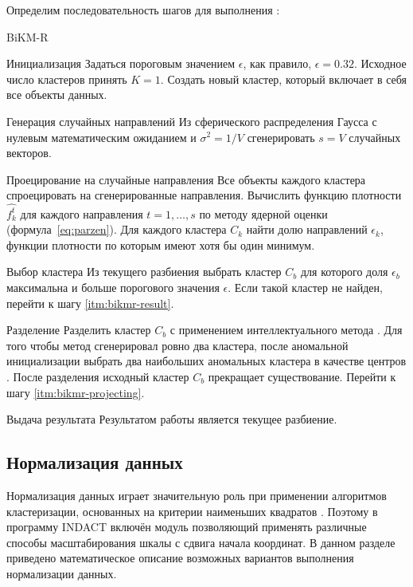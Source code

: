 \documentclass[12pt]{diploma}
\begin{document}
	Определим последовательность шагов для выполнения \BiKMR:
	\begin{algorithm}{BiKM-R}{}
		\begin{astep}{Инициализация}
			Задаться пороговым значением $ \epsilon $, как правило, $ \epsilon=0.32 $. 			Исходное число кластеров принять $ K=1 $. Создать новый кластер, который включает в себя все объекты данных.
		\end{astep}
		\begin{astep}{Генерация случайных направлений}
			Из сферического распределения Гаусса с нулевым математическим ожиданием и $ \sigma^2 = 1/V $ сгенерировать $ s=V $ случайных векторов. 
		\end{astep}
		\begin{astep}{Проецирование на случайные направления} \label{itm:bikmr-projecting}
			Все объекты каждого кластера спроецировать на сгенерированные направления. Вычислить функцию плотности $ \hat{f_k^t} $ для каждого направления $ t=1,\ldots,s $ по методу ядерной оценки (формула~\eqref{eq:parzen}). Для каждого кластера $ C_k $ найти долю направлений $ \epsilon_k $, функции плотности по которым имеют хотя бы один минимум. 
		\end{astep}
		\begin{astep}{Выбор кластера}
			Из текущего разбиения выбрать кластер $ C_{b} $ для которого доля $ \epsilon_b $ максимальна и больше порогового значения $ \epsilon $. Если такой кластер не найден, перейти к шагу \ref{itm:bikmr-result}.
		\end{astep}
		\begin{astep}{Разделение}
			Разделить кластер $ C_b $ с применением интеллектуального метода \ikmeans. Для того чтобы метод \ikmeans сгенерировал ровно два кластера, после аномальной инициализации выбрать два наибольших аномальных кластера в качестве центров \kmeans. После разделения исходный кластер $ C_b $ прекращает существование. Перейти к шагу \ref{itm:bikmr-projecting}.
		\end{astep}		
		\begin{astep}{Выдача результата} \label{itm:bikmr-result}
			Результатом работы \BiKMR является текущее разбиение.
		\end{astep}
	\end{algorithm}
	\subsection{Нормализация данных} \label{subsec:normalization}
		Нормализация данных играет значительную роль при применении алгоритмов кластеризации, основанных на критерии наименьших квадратов \cite{mirkin-ds}. Поэтому в программу INDACT включён модуль позволяющий применять различные способы масштабирования шкалы с сдвига начала координат. В данном разделе приведено  математическое описание возможных вариантов выполнения нормализации данных.
\end{document}
